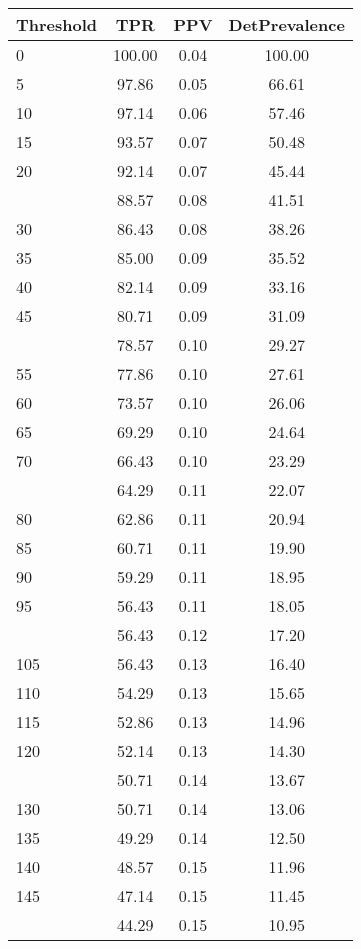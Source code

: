 \begin{table}[ht]
\centering
\begin{tabular}{lccc}
  \toprule
Threshold & TPR & PPV & DetPrevalence \\ 
  \midrule
0 & 100.00 & 0.04 & 100.00 \\ 
  5 & 97.86 & 0.05 & 66.61 \\ 
  10 & 97.14 & 0.06 & 57.46 \\ 
  15 & 93.57 & 0.07 & 50.48 \\ 
  20 & 92.14 & 0.07 & 45.44 \\ 
   \addlinespace
25 & 88.57 & 0.08 & 41.51 \\ 
  30 & 86.43 & 0.08 & 38.26 \\ 
  35 & 85.00 & 0.09 & 35.52 \\ 
  40 & 82.14 & 0.09 & 33.16 \\ 
  45 & 80.71 & 0.09 & 31.09 \\ 
   \addlinespace
50 & 78.57 & 0.10 & 29.27 \\ 
  55 & 77.86 & 0.10 & 27.61 \\ 
  60 & 73.57 & 0.10 & 26.06 \\ 
  65 & 69.29 & 0.10 & 24.64 \\ 
  70 & 66.43 & 0.10 & 23.29 \\ 
   \addlinespace
75 & 64.29 & 0.11 & 22.07 \\ 
  80 & 62.86 & 0.11 & 20.94 \\ 
  85 & 60.71 & 0.11 & 19.90 \\ 
  90 & 59.29 & 0.11 & 18.95 \\ 
  95 & 56.43 & 0.11 & 18.05 \\ 
   \addlinespace
100 & 56.43 & 0.12 & 17.20 \\ 
  105 & 56.43 & 0.13 & 16.40 \\ 
  110 & 54.29 & 0.13 & 15.65 \\ 
  115 & 52.86 & 0.13 & 14.96 \\ 
  120 & 52.14 & 0.13 & 14.30 \\ 
   \addlinespace
125 & 50.71 & 0.14 & 13.67 \\ 
  130 & 50.71 & 0.14 & 13.06 \\ 
  135 & 49.29 & 0.14 & 12.50 \\ 
  140 & 48.57 & 0.15 & 11.96 \\ 
  145 & 47.14 & 0.15 & 11.45 \\ 
   \addlinespace
150 & 44.29 & 0.15 & 10.95 \\ 

\end{tabular}
\end{table}

